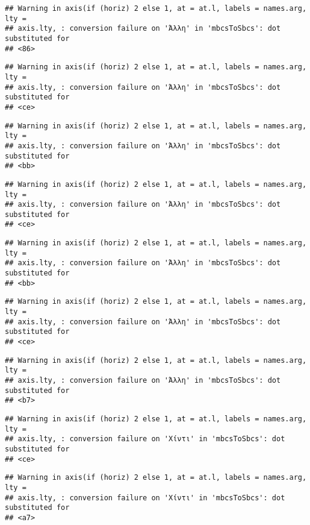 \documentclass[
]{article}
\begin{document}
\begin{verbatim}
## Warning in axis(if (horiz) 2 else 1, at = at.l, labels = names.arg, lty =
## axis.lty, : conversion failure on 'Άλλη' in 'mbcsToSbcs': dot substituted for
## <86>
\end{verbatim}

\begin{verbatim}
## Warning in axis(if (horiz) 2 else 1, at = at.l, labels = names.arg, lty =
## axis.lty, : conversion failure on 'Άλλη' in 'mbcsToSbcs': dot substituted for
## <ce>
\end{verbatim}

\begin{verbatim}
## Warning in axis(if (horiz) 2 else 1, at = at.l, labels = names.arg, lty =
## axis.lty, : conversion failure on 'Άλλη' in 'mbcsToSbcs': dot substituted for
## <bb>
\end{verbatim}

\begin{verbatim}
## Warning in axis(if (horiz) 2 else 1, at = at.l, labels = names.arg, lty =
## axis.lty, : conversion failure on 'Άλλη' in 'mbcsToSbcs': dot substituted for
## <ce>
\end{verbatim}

\begin{verbatim}
## Warning in axis(if (horiz) 2 else 1, at = at.l, labels = names.arg, lty =
## axis.lty, : conversion failure on 'Άλλη' in 'mbcsToSbcs': dot substituted for
## <bb>
\end{verbatim}

\begin{verbatim}
## Warning in axis(if (horiz) 2 else 1, at = at.l, labels = names.arg, lty =
## axis.lty, : conversion failure on 'Άλλη' in 'mbcsToSbcs': dot substituted for
## <ce>
\end{verbatim}

\begin{verbatim}
## Warning in axis(if (horiz) 2 else 1, at = at.l, labels = names.arg, lty =
## axis.lty, : conversion failure on 'Άλλη' in 'mbcsToSbcs': dot substituted for
## <b7>
\end{verbatim}

\begin{verbatim}
## Warning in axis(if (horiz) 2 else 1, at = at.l, labels = names.arg, lty =
## axis.lty, : conversion failure on 'Χίντι' in 'mbcsToSbcs': dot substituted for
## <ce>
\end{verbatim}

\begin{verbatim}
## Warning in axis(if (horiz) 2 else 1, at = at.l, labels = names.arg, lty =
## axis.lty, : conversion failure on 'Χίντι' in 'mbcsToSbcs': dot substituted for
## <a7>
\end{verbatim}
\end{document}

